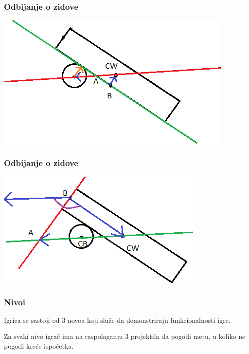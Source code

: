 \documentclass{beamer}
\begin{document}
\begin{frame}
	\frametitle{Odbijanje o zidove}
	
	\includegraphics[scale=0.67]{./images/odbijanje2.png}
\end{frame}

\begin{frame}
	\frametitle{Odbijanje o zidove}
	
	\includegraphics[scale=0.75]{./images/odbijanje3.png}
\end{frame}

\begin{frame}
	\frametitle{Nivoi}
	\Large
	Igrica se sastoji od 3 novoa koji služe da demonstriraju funkcionalnosti igre.
	
	Za svaki nivo igrač ima na raspolaganju 3 projektila da pogodi metu, u koliko ne pogodi kreće ispočetka.
\end{frame}
\end{document}
